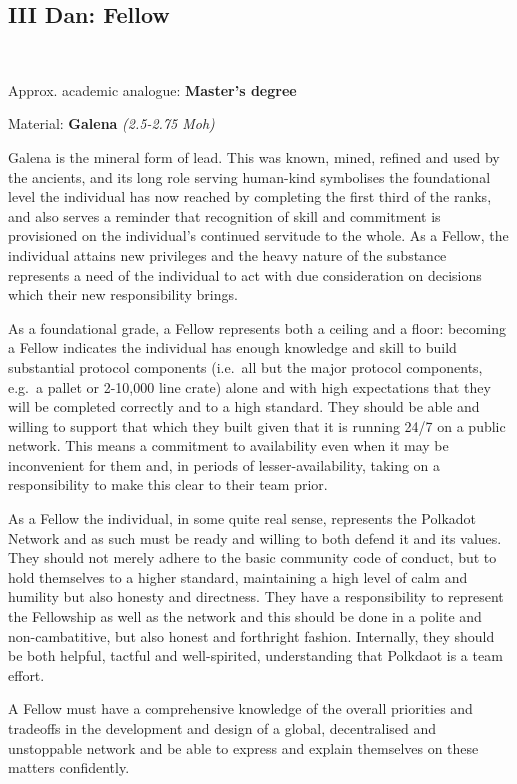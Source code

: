 \documentclass[9pt,oneside]{amsart}
\begin{document}
\subsection{III Dan: Fellow}\label{iii-dan-fellow}~\\


Approx. academic analogue: \textbf{Master's degree}

Material: \textbf{Galena} \emph{(2.5-2.75 Moh)}

Galena is the mineral form of lead. This was known, mined, refined and used by the ancients, and its long role serving human-kind symbolises the foundational level the individual has now reached by completing the first third of the ranks, and also serves a reminder that recognition of skill and commitment is provisioned on the individual's continued servitude to the whole. As a Fellow, the individual attains new privileges and the heavy nature of the substance represents a need of the individual to act with due consideration on decisions which their new responsibility brings.

As a foundational grade, a Fellow represents both a ceiling and a floor: becoming a Fellow indicates the individual has enough knowledge and skill to build substantial protocol components (i.e.~all but the major protocol components, e.g.~a pallet or 2-10,000 line crate) alone and with high expectations that they will be completed correctly and to a high standard. They should be able and willing to support that which they built given that it is running 24/7 on a public network. This means a commitment to availability even when it may be inconvenient for them and, in periods of lesser-availability, taking on a responsibility to make this clear to their team prior.

As a Fellow the individual, in some quite real sense, represents the Polkadot Network and as such must be ready and willing to both defend it and its values. They should not merely adhere to the basic community code of conduct, but to hold themselves to a higher standard, maintaining a high level of calm and humility but also honesty and directness. They have a responsibility to represent the Fellowship as well as the network and this should be done in a polite and non-cambatitive, but also honest and forthright fashion. Internally, they should be both helpful, tactful and well-spirited, understanding that Polkdaot is a team effort.

A Fellow must have a comprehensive knowledge of the overall priorities and tradeoffs in the development and design of a global, decentralised and unstoppable network and be able to express and explain themselves on these matters confidently.
\end{document}
